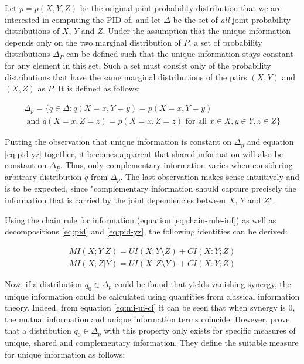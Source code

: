 \documentclass[12pt]{article}
\begin{document}
Let $p = p(X,Y,Z)$ be the original joint probability distribution  that we are interested in computing the PID of, and let $\Delta$ be the set of \textit{all} joint probability distributions of $X$, $Y$ and $Z$. Under the assumption that the unique information depends only on the two marginal distribution of $P$, a set of probability distributions $\Delta_P$ can be defined such that the unique information stays constant for any element in this set. Such a set must consist only of the probability distributions that have the same marginal distributions of the pairs $(X,Y)$ and $(X,Z)$ as $P$. It is defined as follows: 

\begin{multline*}
\Delta_p = \{q \in \Delta: q(X=x, Y=y) = p(X=x, Y=y) \\ 
\text{ and }  q(X=x, Z=z) = p(X=x, Z=z) \text{ for all } x \in X, y \in Y, z \in Z\}
\end{multline*}

Putting the observation that unique information is constant on $\Delta_p$ and equation \ref{eq:pid-yz} together, it becomes apparent that shared information will also be constant on $\Delta_P$. Thus, only complementary information varies when considering arbitrary distribution $q$ from $\Delta_p$. The last observation makes sense intuitively and is to be expected, since "complementary information should capture precisely the information that is carried by the joint dependencies between $X$, $Y$ and $Z$" \cite{bertschinger}. 

Using the chain rule for information (equation \ref{eq:chain-rule-inf}) as well as decompositions \ref{eq:pid} and \ref{eq:pid-yz}, the following identities can be derived: 

\begin{equation}
\begin{split}
MI(X;Y|Z) = UI(X:Y \setminus Z) + CI(X:Y;Z) \\ 
MI(X;Z|Y) = UI(X:Z \setminus Y) + CI(X:Y;Z)
\label{eq:mi-ui-ci}
\end{split}
\end{equation}

Now, if a distribution $q_0 \in \Delta_p$ could be found that yields vanishing synergy, the unique information could be calculated using quantities from classical information theory. Indeed, from equation \ref{eq:mi-ui-ci} it can be seen that when synergy is $0$, the mutual information and unique information terms coincide. However, \cite{bertschinger} prove that a distribution $q_0 \in \Delta_p$ with this property only exists for specific measures of unique, shared and complementary information. They define the suitable measure for unique information as follows:
\end{document}
